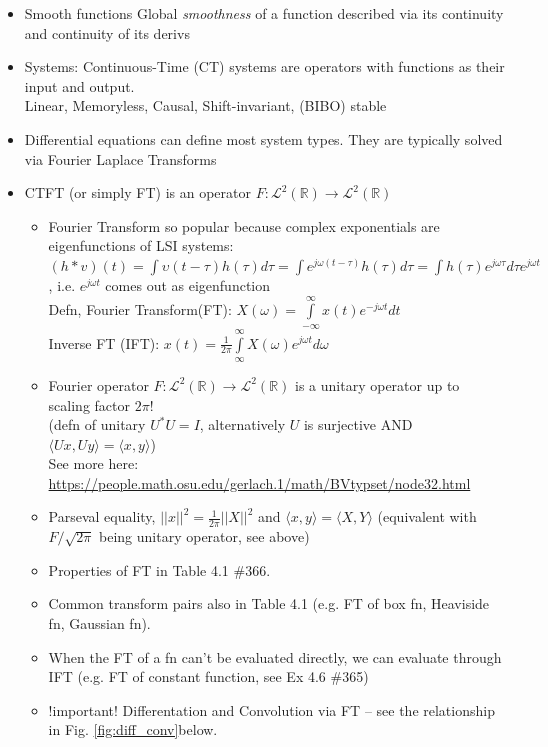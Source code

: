 \documentclass{article}
\newcommand{\la}{\langle}
\newcommand{\ra}{\rangle}
\newcommand{\cg}{\color{gray}}
\newcommand{\fs}{\footnotesize}
\begin{document}
\begin{itemize}
\item Smooth functions	{\cg Global \textit{smoothness} of a function described via its continuity and continuity of its derivs}
\item Systems: Continuous-Time (CT) systems {\cg are operators with functions as their input and output.} \\
{\cg\fs Linear, Memoryless, Causal, Shift-invariant, (BIBO) stable}
\item Differential equations {\cg can define most system types. They are typically solved via Fourier Laplace Transforms}
\item CTFT (or simply FT) is an operator $F:\mathcal{L}^2(\mathbb{R})\rightarrow \mathcal{L}^2(\mathbb{R})$
\begin{itemize}
\item Fourier Transform {\cg so popular because complex exponentials are eigenfunctions of LSI systems:}\\
{\cg $(h\ast v)(t) = \int\upsilon(t-\tau)h(\tau)d\tau=\int e^{j\omega(t-\tau)}h(\tau)d\tau=\int h(\tau)e^{j\omega\tau}d\tau e^{j\omega t}$, i.e. $e^{j\omega t}$ comes out as eigenfunction \\
{\fs
Defn, Fourier Transform(FT): $X(\omega) = \int\limits_{-\infty}^{\infty}x(t)e^{-j\omega t} dt$\\
Inverse FT (IFT): $x(t) = \frac{1}{2\pi}\int\limits_{\infty}^\infty X(\omega) e^{j\omega t}d\omega$}}
\item Fourier operator $F:\mathcal{L}^2(\mathbb{R})\rightarrow \mathcal{L}^2(\mathbb{R})$ is a unitary operator up to scaling factor $2\pi$! \\{\cg\fs (defn of unitary $U^{*}U=I$, alternatively $U$ is surjective AND $\la Ux,Uy \ra=\la x,y \ra$)\\
See more here: \url{https://people.math.osu.edu/gerlach.1/math/BVtypset/node32.html}}
\item Parseval equality, $||x||^{2}=\frac{1}{2\pi}||X||^2$ and $\la x,y \ra = \la X,Y \ra$ {\cg (equivalent with $F/\sqrt{2\pi}$ being unitary operator, see above)}
\item Properties of FT in Table 4.1 \#366.
\item Common transform pairs also in Table 4.1 (e.g. FT of box fn, Heaviside fn, Gaussian fn).
\item When the FT of a fn can't be evaluated directly, we can evaluate through IFT {\cg (e.g. FT of constant function, see Ex 4.6 \#365)}
\item !important! Differentation and Convolution via FT {\cg \--- see the relationship in Fig. \ref{fig:diff_conv}below}.

\end{itemize}
\end{itemize}
\end{document}
